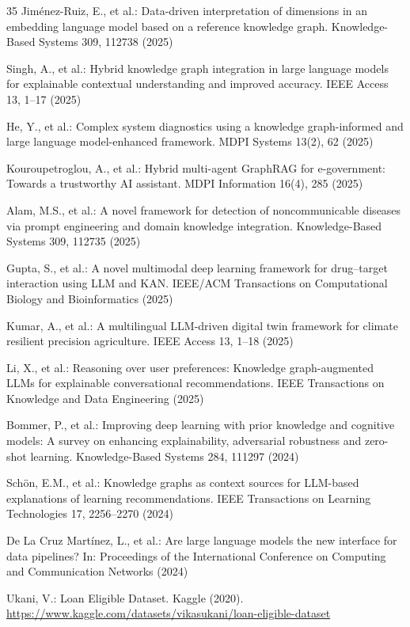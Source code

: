 \documentclass[lnbip]{svmultln}
\begin{document}
\begin{thebibliography}{35}
 Jim\'{e}nez-Ruiz, E., et al.: Data-driven interpretation of dimensions in an embedding language model based on a reference knowledge graph. Knowledge-Based Systems 309, 112738 (2025)

 Singh, A., et al.: Hybrid knowledge graph integration in large language models for explainable contextual understanding and improved accuracy. IEEE Access 13, 1--17 (2025)

 He, Y., et al.: Complex system diagnostics using a knowledge graph-informed and large language model-enhanced framework. MDPI Systems 13(2), 62 (2025)

 Kouroupetroglou, A., et al.: Hybrid multi-agent GraphRAG for e-government: Towards a trustworthy AI assistant. MDPI Information 16(4), 285 (2025)

 Alam, M.S., et al.: A novel framework for detection of noncommunicable diseases via prompt engineering and domain knowledge integration. Knowledge-Based Systems 309, 112735 (2025)

 Gupta, S., et al.: A novel multimodal deep learning framework for drug--target interaction using LLM and KAN. IEEE/ACM Transactions on Computational Biology and Bioinformatics (2025)

 Kumar, A., et al.: A multilingual LLM-driven digital twin framework for climate resilient precision agriculture. IEEE Access 13, 1--18 (2025)

 Li, X., et al.: Reasoning over user preferences: Knowledge graph-augmented LLMs for explainable conversational recommendations. IEEE Transactions on Knowledge and Data Engineering (2025)

 Bommer, P., et al.: Improving deep learning with prior knowledge and cognitive models: A survey on enhancing explainability, adversarial robustness and zero-shot learning. Knowledge-Based Systems 284, 111297 (2024)

 Sch\"{o}n, E.M., et al.: Knowledge graphs as context sources for LLM-based explanations of learning recommendations. IEEE Transactions on Learning Technologies 17, 2256--2270 (2024)

 De La Cruz Mart\'{i}nez, L., et al.: Are large language models the new interface for data pipelines? In: Proceedings of the International Conference on Computing and Communication Networks (2024)

 Ukani, V.: Loan Eligible Dataset. Kaggle (2020). \url{https://www.kaggle.com/datasets/vikasukani/loan-eligible-dataset}

\end{thebibliography}
%
\end{document}
